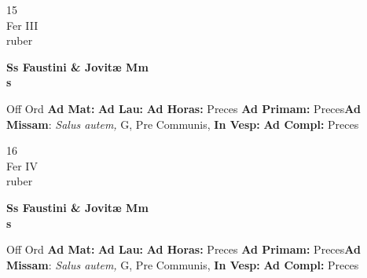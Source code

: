 \documentclass[10pt, openany]{book}
\begin{document}
    \begin{center}
        \begin{minipage}{3.5in}
            \vspace{2em}
            \begin{minipage}{0.5in}
                {\Huge 15} \\
                {\normalsize Fer III} \\
                {\normalsize ruber}
            \end{minipage}
            \begin{minipage}{3.0in}
                \textbf{ \large Ss Faustini \& Jovitæ Mm \\
                \textnormal{\normalsize s}} \\ 
            \end{minipage}
            \begin{justify}Off Ord
                \textbf{Ad Mat: }
                \textbf{Ad Lau: }
                \textbf{Ad Horas: }Preces
                \textbf{Ad Primam: }Preces\textbf{Ad Missam}: \textit{Salus autem,} G, Pre Communis,  
                \textbf{In Vesp: }
                \textbf{Ad Compl: }Preces
            \end{justify}
        \end{minipage}
    \end{center}

    \begin{center}
        \begin{minipage}{3.5in}
            \vspace{2em}
            \begin{minipage}{0.5in}
                {\Huge 16} \\
                {\normalsize Fer IV} \\
                {\normalsize ruber}
            \end{minipage}
            \begin{minipage}{3.0in}
                \textbf{ \large Ss Faustini \& Jovitæ Mm \\
                \textnormal{\normalsize s}} \\ 
            \end{minipage}
            \begin{justify}Off Ord
                \textbf{Ad Mat: }
                \textbf{Ad Lau: }
                \textbf{Ad Horas: }Preces
                \textbf{Ad Primam: }Preces\textbf{Ad Missam}: \textit{Salus autem,} G, Pre Communis,  
                \textbf{In Vesp: }
                \textbf{Ad Compl: }Preces
            \end{justify}
        \end{minipage}
    \end{center}
\end{document}
